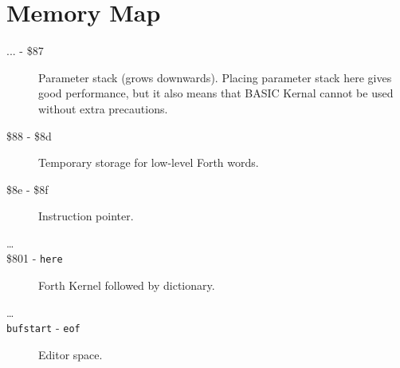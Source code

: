 \chapter{Memory Map}

\begin{description}
\item[... - \$87] Parameter stack (grows downwards). Placing parameter stack here gives good performance, but it also means that BASIC Kernal cannot be used without extra precautions.
\item[\$88 - \$8d] Temporary storage for low-level Forth words.
\item[\$8e - \$8f] Instruction pointer.
\item[\ldots]
\item[\$801 - \texttt{here}] Forth Kernel followed by dictionary.
\item[\ldots]
\item[\texttt{bufstart} - \texttt{eof}] Editor space.
\end{description}

